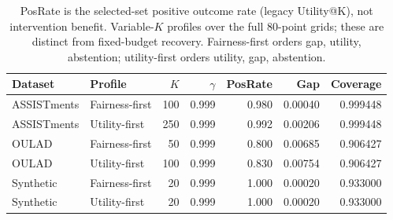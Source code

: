 \begin{table}[t]
\centering
\small
\caption{PosRate is the selected-set positive outcome rate (legacy Utility@K), not intervention benefit. Variable-$K$ profiles over the full 80-point grids; these are distinct from fixed-budget recovery. Fairness-first orders gap, utility, abstention; utility-first orders utility, gap, abstention.}
\label{tab:policy-profiles}
\begin{tabular}{llrrrrr}
\toprule
Dataset & Profile & $K$ & $\gamma$ & PosRate & Gap & Coverage \\
\midrule
ASSISTments & Fairness-first & 100 & 0.999 & 0.980 & 0.00040 & 0.999448 \\
ASSISTments & Utility-first & 250 & 0.999 & 0.992 & 0.00206 & 0.999448 \\
OULAD & Fairness-first & 50 & 0.999 & 0.800 & 0.00685 & 0.906427 \\
OULAD & Utility-first & 100 & 0.999 & 0.830 & 0.00754 & 0.906427 \\
Synthetic & Fairness-first & 20 & 0.999 & 1.000 & 0.00020 & 0.933000 \\
Synthetic & Utility-first & 20 & 0.999 & 1.000 & 0.00020 & 0.933000 \\
\bottomrule
\end{tabular}
\end{table}
